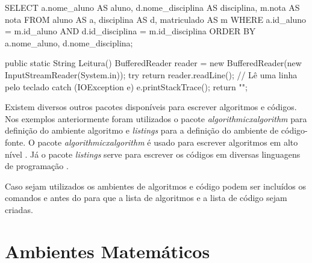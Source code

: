 %

\begin{codigo}[caption = {Consulta SQL}, label={codigo:notas_alunos},language=SQL, breaklines=true]
SELECT a.nome_aluno AS aluno,
       d.nome_disciplina AS disciplina,
       m.nota AS nota
FROM aluno AS a,
     disciplina AS d,
     matriculado AS m
WHERE a.id_aluno = m.id_aluno
  AND d.id_disciplina = m.id_disciplina
ORDER BY a.nome_aluno, d.nome_disciplina;
\end{codigo}

\begin{codigo}[caption={Subrotina para obter uma entrada do usuário}, label={codigo:metodo_leitura}, language=Java, breaklines=true]
public static String Leitura(){
    BufferedReader reader = new BufferedReader(new InputStreamReader(System.in));
    try {
        return reader.readLine(); // Lê uma linha pelo teclado
    } catch (IOException e) {
        e.printStackTrace();
        return "";
    }
}
\end{codigo}

Existem diversos outros pacotes disponíveis para escrever algoritmos e códigos. Nos exemplos anteriormente foram utilizados o pacote \textit{algorithmicxalgorithm} para definição do ambiente algoritmo e \textit{listings} para a definição do ambiente de código-fonte. O pacote \textit{algorithmicxalgorithm} é usado para escrever algoritmos em alto nível \cite{janos:2005:algpseudocode}. Já o pacote \textit{listings} serve para escrever os códigos em diversas linguagens de programação \cite{moses:2006:listings}.

Caso sejam utilizados os ambientes de algoritmos e código podem ser incluídos os comandos  e  antes do  para que a lista de algoritmos e a lista de código sejam criadas.


\section{Ambientes Matemáticos}

